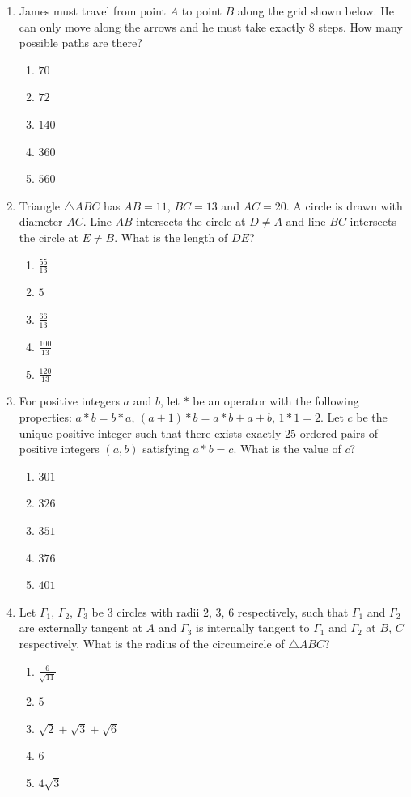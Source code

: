 \documentclass[12pt]{scrartcl}
\begin{document}
\begin{enumerate}
\item James must travel from point $A$ to point $B$ along the grid shown below. He can only move along the arrows and he must take exactly $8$ steps. How many possible paths are there?
\begin{enumerate}
    \item $70$
    \item $72$
    \item $140$
    \item $360$
    \item $560$
\end{enumerate}

\item Triangle $\triangle ABC$ has $AB=11$, $BC=13$ and $AC=20$. A circle is drawn with diameter $AC$. Line $AB$ intersects the circle at $D\ne A$ and line $BC$ intersects the circle at $E\ne B$. What is the length of $DE$?
\begin{enumerate}
    \item $\frac{55}{13}$
    \item $5$
    \item $\frac{66}{13}$
    \item $\frac{100}{13}$
    \item $\frac{120}{13}$
\end{enumerate}

\item For positive integers $a$ and $b$, let $*$ be an operator with the following properties: $a*b=b*a$, $(a+1)*b=a*b+a+b$, $1*1=2$. Let $c$ be the unique positive integer such that there exists exactly $25$ ordered pairs of positive integers $(a, b)$ satisfying $a*b=c$. What is the value of $c$?
\begin{enumerate}
    \item $301$
    \item $326$
    \item $351$
    \item $376$
    \item $401$
\end{enumerate}

\item Let $\Gamma_{1}$, $\Gamma_{2}$, $\Gamma_{3}$ be $3$ circles with radii $2$, $3$, $6$ respectively, such that $\Gamma_{1}$ and $\Gamma_{2}$ are externally tangent at $A$ and $\Gamma_{3}$ is internally tangent to $\Gamma_{1}$ and $\Gamma_{2}$ at $B$, $C$ respectively. What is the radius of the circumcircle of $\triangle ABC$?
\begin{enumerate}
    \item $\frac{6}{\sqrt{11}}$
    \item $5$
    \item $\sqrt{2}+\sqrt{3}+\sqrt{6}$
    \item $6$
    \item $4\sqrt{3}$
\end{enumerate}


\end{enumerate}
\end{document}
